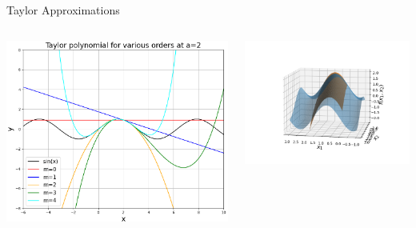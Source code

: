 \documentclass[11pt,compress,t,notes=noshow, xcolor=table]{beamer}
\begin{document}
\begin{vbframe}{Taylor Approximations}
\begin{columns}
\begin{column}{0.45\textwidth}
\includegraphics[width=\columnwidth]{figure_man/taylor_univariate.png}
\end{column}
\begin{column}{0.55\textwidth}
\includegraphics[width=\columnwidth]{figure_man/Taylor2D/Taylor2D_2nd-100.png}
\end{column}
\end{columns}


\end{vbframe}
\end{document}
